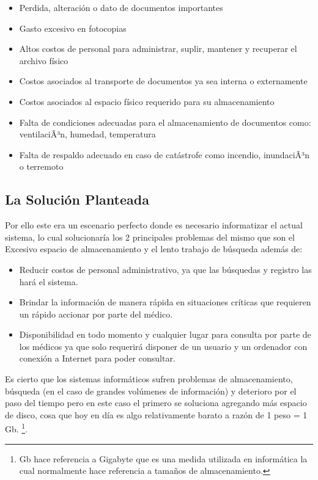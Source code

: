 \begin{itemize}
    \item Perdida, alteración o dato de documentos importantes
    \item Gasto excesivo en fotocopias
    \item Altos costos de personal para administrar, suplir, mantener y recuperar el archivo físico
    \item Costos asociados al transporte de documentos ya sea interna o externamente
    \item Costos asociados al espacio físico requerido para su almacenamiento
    \item Falta de condiciones adecuadas para el almacenamiento de documentos como: ventilaciÃ³n, humedad, temperatura
    \item Falta de respaldo adecuado en caso de catástrofe como incendio, inundaciÃ³n o terremoto
\end{itemize}


\subsection{La Solución Planteada}

Por ello este era un escenario perfecto donde es necesario informatizar el actual sistema, lo cual solucionaría los 2 principales problemas del mismo que son el Excesivo espacio de almacenamiento y el lento trabajo de búsqueda además de:

\begin{itemize}
    \item Reducir costos de personal administrativo, ya que las búsquedas y registro las hará el sistema.
    \item Brindar la información de manera rápida en situaciones críticas que requieren un rápido accionar por parte del médico.
   \item Disponibilidad en todo momento y cualquier lugar para consulta por parte de los médicos ya que solo requerirá disponer de un usuario y un ordenador con conexión a Internet para poder consultar.
\end{itemize}

Es cierto que los sistemas informáticos sufren problemas de almacenamiento, búsqueda (en el caso de grandes volúmenes de información) y deterioro por el paso del tiempo pero en este caso el primero se soluciona agregando más espacio de disco, cosa que hoy en día es algo relativamente barato a razón de 1 peso = 1 Gb. \footnote{Gb hace referencia a Gigabyte que es una medida utilizada en informática la cual normalmente hace referencia a tamaños de almacenamiento.}.  \\[0.1cm]

